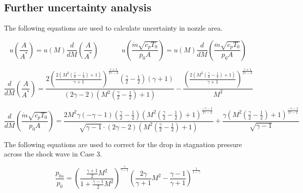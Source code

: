 \documentclass{article}
\begin{document}
\subsection{Further uncertainty analysis}

The following equations are used to calculate uncertainty in nozzle area.

\begin{equation}
    u\left( \frac{A}{A^*} \right) = u(M) \frac{d}{dM}\left( \frac{A}{A^*} \right) \;\;\;\;\;\;\;\;\;\;\;\; u\left( \frac{\dot{m}\sqrt{c_pT_0}}{p_0A} \right) = u(M) \frac{d}{dM}\left( \frac{\dot{m}\sqrt{c_pT_0}}{p_0A} \right)
\end{equation}

\begin{equation}
    \frac{d}{dM}\left( \frac{A}{A^*} \right) = \frac{2 \left(\frac{2 \left(M^{2} \left(\frac{\gamma}{2} - \frac{1}{2}\right) + 1\right)}{\gamma + 1}\right)^{\frac{\gamma + 1}{2 \gamma - 2}} \left(\frac{\gamma}{2} - \frac{1}{2}\right) \left(\gamma + 1\right)}{\left(2 \gamma - 2\right) \left(M^{2} \left(\frac{\gamma}{2} - \frac{1}{2}\right) + 1\right)} - \frac{\left(\frac{2 \left(M^{2} \left(\frac{\gamma}{2} - \frac{1}{2}\right) + 1\right)}{\gamma + 1}\right)^{\frac{\gamma + 1}{2 \gamma - 2}}}{M^{2}}
    \label{eqn:dA_dM}
\end{equation}

\begin{equation}
    \frac{d}{dM}\left( \frac{\dot{m}\sqrt{c_pT_0}}{p_0A} \right) = \frac{2 M^{2} \gamma \left(- \gamma - 1\right) \left(\frac{\gamma}{2} - \frac{1}{2}\right) \left(M^{2} \left(\frac{\gamma}{2} - \frac{1}{2}\right) + 1\right)^{\frac{- \gamma - 1}{2 \gamma - 2}}}{\sqrt{\gamma - 1} \cdot \left(2 \gamma - 2\right) \left(M^{2} \left(\frac{\gamma}{2} - \frac{1}{2}\right) + 1\right)} + \frac{\gamma \left(M^{2} \left(\frac{\gamma}{2} - \frac{1}{2}\right) + 1\right)^{\frac{- \gamma - 1}{2 \gamma - 2}}}{\sqrt{\gamma - 1}}
    \label{eqn:dmdot_dM}
\end{equation}

The following equations are used to correct for the drop in stagnation pressure across the shock wave in Case 3.

\begin{equation}
    \frac{p_{0s}}{p_0} = \left( \frac{\frac{\gamma+1}{2}M^2}{1 + \frac{\gamma-1}{2}M^2}\right) ^ \frac{\gamma}{\gamma-1} \left( \frac{2\gamma}{\gamma+1} M^2 - \frac{\gamma-1}{\gamma+1}\right) ^ \frac{1}{1 - \gamma}
\end{equation}
\end{document}
